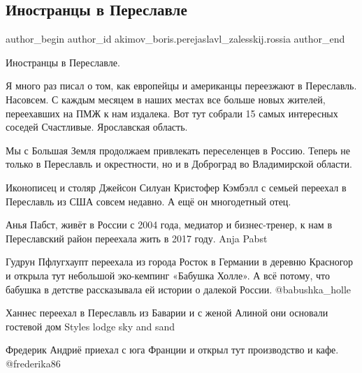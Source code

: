  
 
 
 
 
 
\subsection{Иностранцы в Переславле}
\label{sec:21_01_2022.fb.akimov_boris.perejaslavl_zalesskij.rossia.1.inostrancy}
 
\ifcmt
 author_begin
   author_id akimov_boris.perejaslavl_zalesskij.rossia
 author_end
\fi

Иностранцы в Переславле. 

Я много раз писал о том, как европейцы и американцы переезжают в Переславль.
Насовсем. С каждым месяцем в наших местах все больше новых жителей, переехавших
на ПМЖ к нам издалека. Вот тут собрали 15 самых интересных соседей Счастливые.
Ярославская область. 

Мы с Большая Земля продолжаем привлекать переселенцев в Россию. Теперь не
только в Переславль и окрестности, но и в Доброград во Владимирской области. 

Иконописец и столяр Джейсон Силуан Кристофер Кэмбэлл с семьей переехал в
Переславль из США совсем недавно. А ещё он многодетный отец.

Анья Пабст, живёт в России с 2004 года, медиатор и  бизнес-тренер, к нам в
Переславский район переехала жить в 2017 году. Anja Pabst

Гудрун Пфлугхаупт переехала из города Росток в Германии в деревню Красногор и
открыла тут небольшой эко-кемпинг «Бабушка Холле». А всё потому, что бабушка в
детстве рассказывала ей истории о далекой России. @babushka\_holle

Ханнес переехал в Переславль из Баварии и с женой Алиной они основали гостевой
дом Styles lodge sky and sand

Фредерик Андриё приехал с юга Франции и открыл тут производство и кафе.
@frederika86

